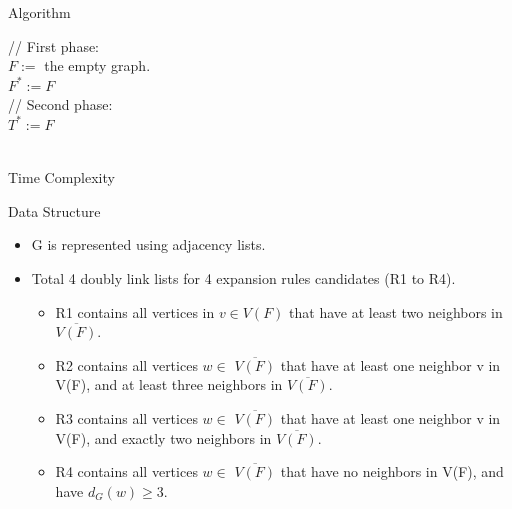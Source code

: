 \documentclass{beamer}
\begin{document}
\begin{frame}{Algorithm}
    \begin{algorithm}[H]\footnotesize
    \SetAlgoLined
    // First phase:\
    \\$F :=$ the empty graph.\
    \\
    $F^* := F$\
    \\// Second phase:\
    \\
    $T^* := F$\
    \\\
    
    \end{algorithm} 
\end{frame}

\begin{frame}{Time Complexity}
    \begin{exampleblock}{Data Structure}
        \begin{itemize}
            \item G is represented using adjacency lists.
            \item Total 4 doubly link lists for 4 expansion rules candidates (R1 to R4).
            \begin{itemize}
                \item R1 contains all vertices in $v \in V(F)$ that have at least two neighbors in $\overline{V(F)}$.
                \item R2 contains all vertices $w \in$ $\overline{V(F)}$ that have at least one neighbor v in V(F), and at least three neighbors in $\overline{V(F)}$.
                \item R3 contains all vertices $w \in$ $\overline{V(F)}$ that have at least one neighbor v in V(F), and exactly two neighbors in $\overline{V(F)}$.
                \item R4 contains all vertices $w \in$ $\overline{V(F)}$ that have no neighbors in V(F), and have $d_G(w) \geq 3$.
            \end{itemize}
        \end{itemize}
        
    \end{exampleblock}
    
\end{frame}
\end{document}
